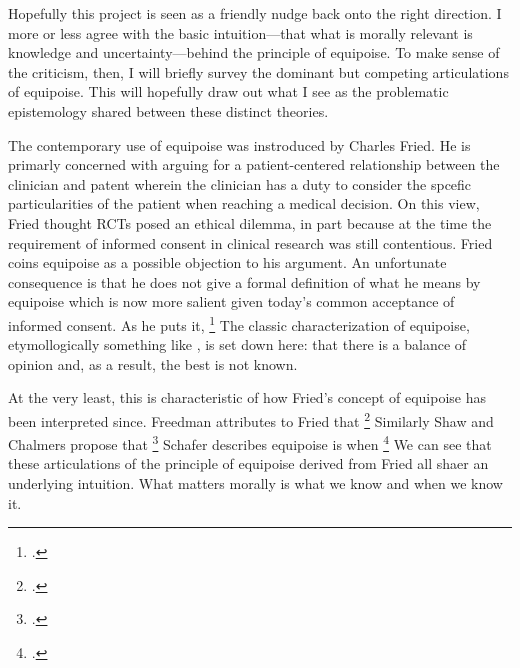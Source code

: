 \documentclass[letterpaper,notitlepage,12pt]{article}
\begin{document}
Hopefully this project is seen as a friendly nudge back onto the right
direction.
I more or less agree with the basic intuition---that what is morally relevant is
knowledge and uncertainty---behind the principle of equipoise.
To make sense of the criticism, then, I will briefly survey the dominant but
competing articulations of equipoise.
This will hopefully draw out what I see as the problematic epistemology shared
between these distinct theories.

The contemporary use of equipoise was instroduced by Charles Fried.
He is primarly concerned with arguing for a patient-centered relationship
between the clinician and patent wherein the clinician has a duty to consider
the spcefic particularities of the patient when reaching a medical decision.
On this view, Fried thought RCTs posed an ethical dilemma, in part because at
the time the requirement of informed consent in clinical research was still
contentious.
Fried coins equipoise as a possible objection to his argument.
An unfortunate consequence is that he does not give a formal definition of what
he means by equipoise which is now more salient given today's common acceptance
of informed consent.
As he puts it, \footcite[p. 58]{fried_medical_2016}
The classic characterization of equipoise, etymollogically something like
, is set down here: that there is a balance of opinion
and, as a result, the best is not known.

At the very least, this is characteristic of how Fried's concept of equipoise
has been interpreted since.
Freedman attributes to Fried that \footcite[p.
141]{freedman_equipoise_1987}
Similarly Shaw and Chalmers propose that \footcite[p.487]{shaw_ethics_1970}
Schafer describes equipoise is when \footcite[p.
4]{schafer_commentary_1985}
We can see that these articulations of the principle of equipoise derived
from Fried all shaer an underlying intuition.
What matters morally is what we know and when we know it.
\end{document}

